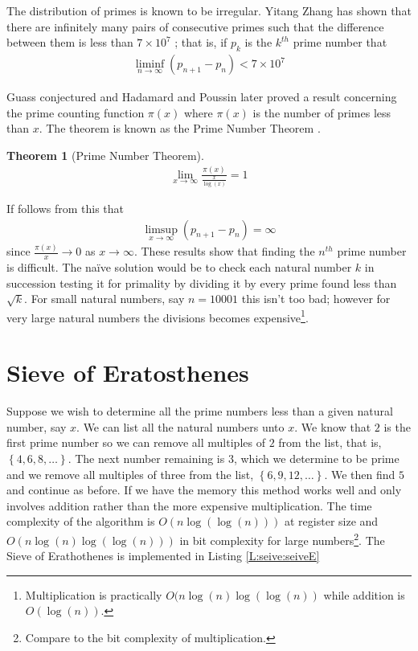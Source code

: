 \documentclass[oneside,12pt]{book}   	%
\newcounter{ex}
\newcounter{pr}
\newtheorem{thm}{Theorem}[chapter]
\theoremstyle{definition}
\newcommand{\set}[1]{\left\{#1\right\}}
\begin{document}
\begin{spacing}{1.618}
			The distribution of primes is known to be irregular. Yitang Zhang has shown that there are infinitely many pairs of consecutive primes such that the difference between them is less than $7\times 10^7$ \cite{Zhang2013}; that is, if $p_k$ is the $k^{th}$ prime number that 
			\begin{alignat}{4}
				\liminf_{n\to\infty}(p_{n+1}-p_n)<7\times 10^7
			\end{alignat}
			
			 Guass conjectured and Hadamard and Poussin later proved a result concerning the prime counting function $\pi(x)$ where $\pi(x)$ is the number of primes less than $x$. The theorem is known as the Prime Number Theorem \cite{Andrews1971}.

			\begin{thm}[Prime Number Theorem]
				\begin{alignat}{4}
					\lim_{x\to\infty}\frac{\pi(x)}{\frac{x}{\log{(x)}}}=1
				\end{alignat} 
			\end{thm}
			If follows from this that 
			\begin{alignat}{4}
				\limsup_{x\to\infty}(p_{n+1}-p_n) = \infty
			\end{alignat}
			since $\frac{\pi(x)}{x}\to 0$ as $x\to \infty$. These results show that finding the $n^{th}$ prime number is difficult. The na\"ive solution would be to check each natural number $k$ in succession testing it for primality by dividing it by every prime found less than $\sqrt{k}$. For small natural numbers, say $n=10001$ this isn't too bad; however for very large natural numbers the divisions becomes expensive\footnote{Multiplication is practically $O(n\log{(n)}\log{(\log{(n)})}$ while addition is $O(\log{(n)})$. }. 
			
		\section{Sieve of Eratosthenes}
		
			Suppose we wish to determine all the prime numbers less than a given natural number, say $x$. We can list all the natural numbers unto $x$. We know that $2$ is the first prime number so we can remove all multiples of $2$ from the list, that is, $\set{4, 6, 8, \dots}$. The next number remaining is $3$, which we determine to be prime and we remove all multiples of three from the list, $\set{6, 9, 12, \dots}$. We then find $5$ and continue as before. If we have the memory this method works well and only involves addition rather than the more expensive multiplication. The time complexity of the algorithm is $O(n\log{(\log{(n)})})$ at register size and $O(n\log{(n)}\log{(\log{(n)})})$ in bit complexity for large numbers\footnote{Compare to the bit complexity of multiplication.}. The Sieve of Erathothenes is implemented in Listing \ref{L:seive:seiveE}
			

\end{spacing}
\end{document}
